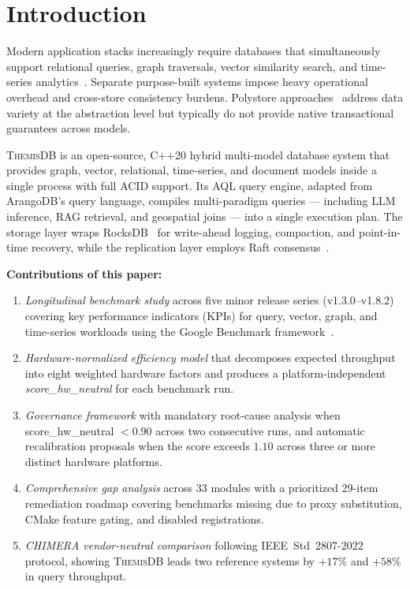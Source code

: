 \documentclass[conference]{IEEEtran}
\newcommand{\themis}{\textsc{ThemisDB}}
\begin{document}
\section{Introduction}
\label{sec:intro}

Modern application stacks increasingly require databases that
simultaneously support relational queries, graph traversals, vector
similarity search, and time-series analytics~\cite{Lu2018,Stonebraker2010}.
Separate purpose-built systems impose heavy operational overhead and
cross-store consistency burdens.
Polystore approaches~\cite{Atzeni2016} address data variety at the
abstraction level but typically do not provide native transactional
guarantees across models.

\themis{} is an open-source, C++20 hybrid multi-model database system
that provides graph, vector, relational, time-series, and document
models inside a single process with full ACID support.
Its AQL query engine, adapted from ArangoDB's query language,
compiles multi-paradigm queries — including LLM inference, RAG
retrieval, and geospatial joins — into a single execution plan.
The storage layer wraps RocksDB~\cite{Dong2021} for write-ahead
logging, compaction, and point-in-time recovery, while the
replication layer employs Raft consensus~\cite{Ongaro2014}.

\textbf{Contributions of this paper:}
\begin{enumerate}
  \item \emph{Longitudinal benchmark study} across five minor release
        series (v1.3.0--v1.8.2) covering key performance indicators
        (KPIs) for query, vector, graph, and time-series workloads
        using the Google Benchmark framework~\cite{GoogleBenchmark}.
  \item \emph{Hardware-normalized efficiency model} that decomposes
        expected throughput into eight weighted hardware factors and
        produces a platform-independent \emph{score\_hw\_neutral}
        for each benchmark run.
  \item \emph{Governance framework} with mandatory root-cause analysis
        when score\_hw\_neutral $< 0.90$ across two consecutive runs,
        and automatic recalibration proposals when the score exceeds
        $1.10$ across three or more distinct hardware platforms.
  \item \emph{Comprehensive gap analysis} across 33 modules with a
        prioritized 29-item remediation roadmap covering benchmarks
        missing due to proxy substitution, CMake feature gating,
        and disabled registrations.
  \item \emph{CHIMERA vendor-neutral comparison} following
        IEEE~Std~2807-2022 protocol, showing \themis{} leads two
        reference systems by $+17\%$ and $+58\%$ in query throughput.
\end{enumerate}
\end{document}
